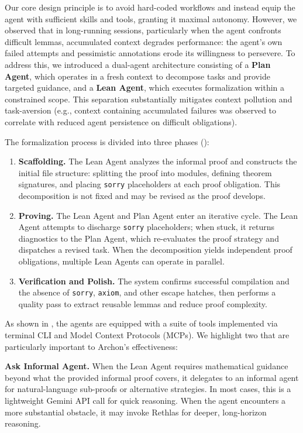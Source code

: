 \documentclass[]{pkuai4m}
\theoremstyle{plain}
\theoremstyle{definition}
\begin{document}
Our core design principle is to avoid hard-coded workflows and instead equip the agent with sufficient skills and tools, granting it maximal autonomy. However, we observed that in long-running sessions, particularly when the agent confronts difficult lemmas, accumulated context degrades performance: the agent's own failed attempts and pessimistic annotations erode its willingness to persevere. To address this, we introduced a dual-agent architecture consisting of a \textbf{Plan Agent}, which operates in a fresh context to decompose tasks and provide targeted guidance, and a \textbf{Lean Agent}, which executes formalization within a constrained scope. This separation substantially mitigates context pollution and task-aversion (e.g., context containing accumulated failures was observed to correlate with reduced agent persistence on difficult obligations).

The formalization process is divided into three phases ():
\begin{enumerate}
    \item \textbf{Scaffolding.} The Lean Agent analyzes the informal proof and constructs the initial file structure: splitting the proof into modules, defining theorem signatures, and placing \texttt{sorry} placeholders at each proof obligation. This decomposition is not fixed and may be revised as the proof develops.
    \item \textbf{Proving.} The Lean Agent and Plan Agent enter an iterative cycle. The Lean Agent attempts to discharge \texttt{sorry} placeholders; when stuck, it returns diagnostics to the Plan Agent, which re-evaluates the proof strategy and dispatches a revised task. When the decomposition yields independent proof obligations, multiple Lean Agents can operate in parallel.
    \item \textbf{Verification and Polish.} The system confirms successful compilation and the absence of \texttt{sorry}, \texttt{axiom}, and other escape hatches, then performs a quality pass to extract reusable lemmas and reduce proof complexity.
\end{enumerate}

As shown in , the agents are equipped with a suite of tools implemented via terminal CLI and Model Context Protocols (MCPs). We highlight two that are particularly important to Archon's effectiveness:

\textbf{Ask Informal Agent.} When the Lean Agent requires mathematical guidance beyond what the provided informal proof covers, it delegates to an informal agent for natural-language sub-proofs or alternative strategies. In most cases, this is a lightweight Gemini API call for quick reasoning. When the agent encounters a more substantial obstacle, it may invoke Rethlas for deeper, long-horizon reasoning.
\end{document}
